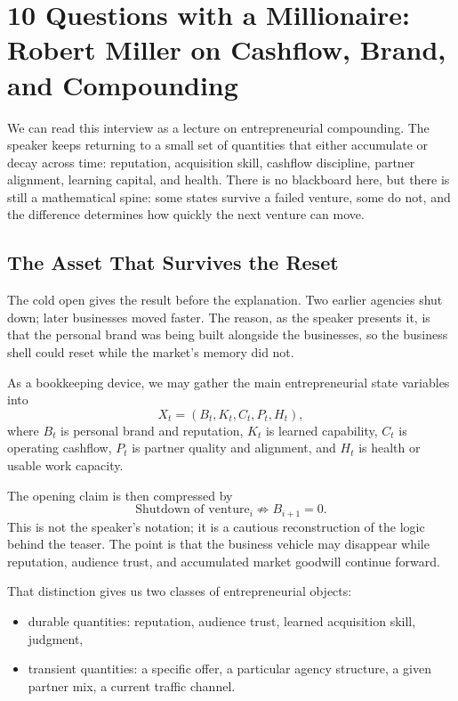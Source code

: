 \chapter{10 Questions with a Millionaire: Robert Miller on Cashflow, Brand, and Compounding}

We can read this interview as a lecture on entrepreneurial compounding. The speaker keeps returning to a small set of quantities that either accumulate or decay across time: reputation, acquisition skill, cashflow discipline, partner alignment, learning capital, and health. There is no blackboard here, but there is still a mathematical spine: some states survive a failed venture, some do not, and the difference determines how quickly the next venture can move.

\section{The Asset That Survives the Reset}

The cold open gives the result before the explanation. Two earlier agencies shut down; later businesses moved faster. The reason, as the speaker presents it, is that the personal brand was being built alongside the businesses, so the business shell could reset while the market's memory did not.

As a bookkeeping device, we may gather the main entrepreneurial state variables into
\begin{equation}
X_t=(B_t,K_t,C_t,P_t,H_t),
\end{equation}
where \(B_t\) is personal brand and reputation, \(K_t\) is learned capability, \(C_t\) is operating cashflow, \(P_t\) is partner quality and alignment, and \(H_t\) is health or usable work capacity.

The opening claim is then compressed by
\begin{equation}
\text{Shutdown of venture}_i \not\Rightarrow B_{i+1}=0.
\end{equation}
This is not the speaker's notation; it is a cautious reconstruction of the logic behind the teaser. The point is that the business vehicle may disappear while reputation, audience trust, and accumulated market goodwill continue forward.

That distinction gives us two classes of entrepreneurial objects:
\begin{itemize}
\item durable quantities: reputation, audience trust, learned acquisition skill, judgment,
\item transient quantities: a specific offer, a particular agency structure, a given partner mix, a current traffic channel.
\end{itemize}

